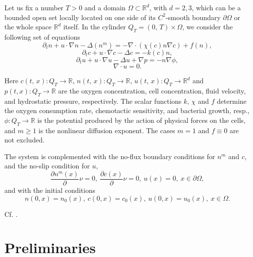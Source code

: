 \documentclass[10pt]{amsart}
\begin{document}
Let us fix a number $T>0$ and a domain $\Omega\subset {\mathbb{R}}^{d}$, with $d=2,3$, which can be a bounded open set locally located on one side of its $C^2$-smooth boundary $\partial \Omega$ or the whole space  ${\mathbb{R}}^{d}$ itself. In the cylinder $Q_{T} =
(0,\, T) \times \Omega$, we
consider the following set of equations
\begin{equation}\label{ksn1}
\partial_t n + u \cdot \nabla  n - \Delta (n^m)= -\nabla\cdot (\chi (c) n \nabla c)+f(n),\end{equation} \begin{equation} \label{ksn2}
\partial_t c + u \cdot \nabla c-\Delta c =-k(c) n,\end{equation} \begin{equation} \label{ksn3}
\partial_t u + u\cdot \nabla u -\Delta u +\nabla p=-n \nabla
\phi,\end{equation} \begin{equation} \label{ksn4}
\nabla \cdot u=0.
\end{equation}

Here $c(t,\,x) : Q_{T} \rightarrow {\mathbb{R}}$, $n(t,\,x) : Q_{T}
\rightarrow {\mathbb{R}}$, $u(t,\, x) : Q_{T} \rightarrow {\mathbb{R}}^{d}$ and
$p(t,x) :  Q_{T} \rightarrow {\mathbb{R}}$ are the oxygen concentration,
cell concentration, fluid velocity, and hydrostatic pressure,
respectively. The scalar functions $k$, $\chi$ and $f$ determine the oxygen
consumption rate, 
chemotactic sensitivity, and bacterial growth, resp., $\phi:Q_{T} \rightarrow {\mathbb{R}}$ is the potential produced by the action of physical forces on the cells, and $m\geq 1$ is the nonlinear diffusion exponent. The cases $m=1$ and $f\equiv 0$ are not excluded.

The system is complemented with the no-flux boundary conditions for $n^m$ and $c$, and the no-slip condition for $u$,
\begin{equation} \label{ksnb} {\frac{\partial {n^m(x)}}{\partial  }}\nu = 0,\ {\frac{\partial {c(x)}}{\partial  }}\nu = 0,\ u(x)=0,\ x\in \partial \Omega,\end{equation}
and with the initial conditions \begin{equation} \label{ksn5} n(0,x)=n_0(x),\ c(0,x)=c_0(x),\ u(0,x)=u_0(x),\ x\in \Omega.\end{equation}

Cf. \cite{w12,w10,pk92,hp05,tw12,ll11,ckl11,tuval,mt96,mt02,mt06,wh07,npr08,l10,flm10,hp09,dlm10}.

\section{Preliminaries}
\end{document}
